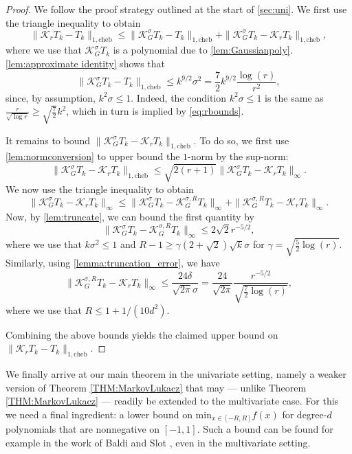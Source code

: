 \documentclass[11pt]{article}
\renewcommand{\min}{\mathrm{min}}
\theoremstyle{definition}
\newcommand{\const}[1]{1/(10 #1^2)}
\newcommand{\cheb}{{1,\mathrm{cheb}}}
\begin{document}
\begin{proof}
We follow the proof strategy outlined at the start of \cref{sec:uni}.
We first use the triangle inequality to obtain
\[
\|\mathcal K_r T_k - T_k \|_\cheb \leq \|\mathcal K_G^\sigma T_k - T_k \|_\cheb + \|\mathcal K_G^\sigma T_k - \mathcal K_r T_k\|_\cheb,
\]
where we use that $\mathcal K_G^\sigma T_k$ is a polynomial due to \cref{lem:Gaussianpoly}. \cref{lem:approximate identity} shows
 that $$\|\mathcal K_G^\sigma T_k - T_k \|_\cheb \leq {k^{9/2} \sigma^2 = \frac{7}{2}k^{9/2} \frac{\log(r)}{r^2}},$$
 since, by assumption, {$k^2 \sigma \leq 1$}.
 {Indeed, the condition $k^2 \sigma \leq 1$ is the same as $\frac{r}{\sqrt{\log r}} \ge \sqrt{\frac{7}{2}}k^2$, which in turn is implied by
 \eqref{eq:rbounds}.}

It remains to bound $ \|\mathcal K_G^\sigma T_k - \mathcal K_r T_k\|_\cheb$. To do so, we first use \cref{lem:normconversion} to upper bound the $1$-norm by the sup-norm:
\[
\|\mathcal K_G^\sigma T_k - \mathcal K_r T_k\|_\cheb \leq \sqrt{2(r+1)} \|\mathcal K_G^\sigma T_k - \mathcal K_r T_k\|_\infty.
\]
We now use the triangle inequality to obtain
\[
\|\mathcal K_G^\sigma T_k - \mathcal K_r T_k\|_\infty \leq \|\mathcal K_G^\sigma T_k - \mathcal K_G^{\sigma,R} T_k\|_\infty + \|\mathcal K_G^{\sigma,R} T_k - \mathcal K_r T_k\|_\infty.
\]
Now, by \cref{lem:truncate}, we can bound the first quantity by
\[
\|\mathcal K_G^\sigma T_k - \mathcal K_G^{\sigma,R} T_k\|_\infty \leq 2 \sqrt{2} r^{-5/2},
\]
where we use that $k \sigma^2 \leq 1$ and $R-1 \geq \gamma (2+\sqrt{2}) \sqrt{k}\sigma$ for $\gamma = \sqrt{\frac{5}{2} \log(r)}$. Similarly, using \cref{lemma:truncation_error}, we have
\[
\|\mathcal K_G^{\sigma,R} T_k - \mathcal K_r T_k\|_\infty \leq \frac{24\delta}{\sqrt{2\pi}\sigma} = \frac{24}{\sqrt{2\pi}} \frac{r^{-5/2}}{\sqrt{\frac{7}{2}\log(r)}},
\]
where we use that $R \leq 1+ \const{d}$.

Combining the above bounds yields the claimed upper bound on $\|\mathcal K_r T_k - T_k \|_\cheb$.
\end{proof}



We finally arrive at our main theorem in the univariate setting, namely a weaker version of Theorem \ref{THM:MarkovLukacz} that may --- unlike
Theorem \ref{THM:MarkovLukacz} ---
readily be extended to the multivariate case.
For this we need a final ingredient:  a lower bound on $\min_{x \in [-R,R]} f(x)$ for degree-$d$ polynomials that are nonnegative on $[-1,1]$.
 Such a bound can be found for example in the work of Baldi and Slot \cite{doi:10.1137/23M1555430}, even in the multivariate setting.
\end{document}

